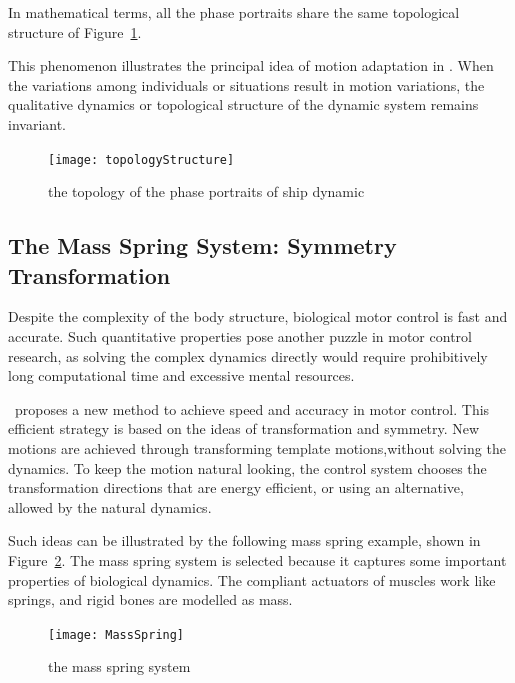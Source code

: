 In mathematical terms, all the phase portraits share the same topological structure of Figure~\ref{fig:topologyStructure}.

This phenomenon illustrates the principal idea of motion adaptation in {\moit}.
When the variations among individuals or situations result in motion variations, the qualitative dynamics or topological structure of the dynamic system remains invariant.

\begin{figure}[!htbp]
  \begin{center}
   \texttt{[image: topologyStructure]}
   \caption{the topology of the phase portraits of ship dynamic}
   \label{fig:topologyStructure}
  \end{center}
\end{figure}




\subsection{The Mass Spring System:  Symmetry Transformation}
Despite the complexity of the body structure, biological motor control is fast and accurate.
Such quantitative properties pose another puzzle in motor control research, as solving the complex dynamics directly would require prohibitively long computational time and excessive mental resources.

{\moit}\ proposes a new method to achieve speed and accuracy in motor control.
This efficient strategy is based on the ideas of transformation and symmetry.
New motions are achieved through transforming template motions,without solving the dynamics. 
To keep the motion natural looking, the control system chooses the transformation directions that are energy efficient, or using an alternative, allowed by the natural dynamics.


Such ideas can be illustrated by the following mass spring example, shown in Figure~\ref{fig:massspring}.
The mass spring system is selected because it captures some important properties of biological dynamics.
The compliant actuators of muscles work like springs, and rigid bones are modelled as mass.


\begin{figure}[!htbp]
  \begin{center}
    \texttt{[image: MassSpring]}
    \caption{the mass spring system}
    \label{fig:massspring}
  \end{center}
\end{figure}

